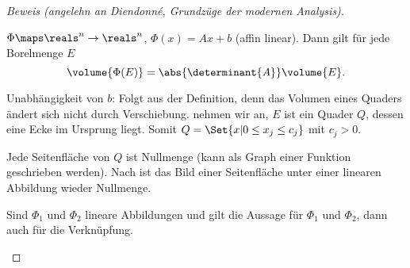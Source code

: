 \begin{proof}[Beweis (angelehn an Diendonné, Grundzüge der modernen Analysis)]
\begin{subproof}
  \end{subproof}
  \begin{lemma}\label{affin_lineare_funzt_mit_borelmenge}
    \( \Phi\maps \reals^n\to \reals^n \), \( \Phi(x)=Ax+b \) (affin linear). Dann gilt für jede Borelmenge \( E \)
    \begin{equation*}
      \volume{\Phi(E)}=\abs{\determinant{A}}\volume{E}.
    \end{equation*}
  \end{lemma}
  \begin{subproof}
    Unabhängigkeit von \( b \): Folgt aus der Definition, denn das Volumen eines Quaders ändert sich nicht durch Verschiebung. \Obda nehmen wir an, \( E \) ist ein Quader \( Q \), dessen eine Ecke im Ursprung liegt. Somit \obda \( Q=\Set{x|0\leq x_j\leq c_j}\) mit \( c_j>0 \).

    Jede Seitenfläche von \( Q \) ist Nullmenge (kann als Graph einer Funktion geschrieben werden). Nach  ist das Bild einer Seitenfläche unter einer linearen Abbildung wieder Nullmenge.

    Sind \( \Phi_1 \) und \( \Phi_2 \) lineare Abbildungen und gilt die Aussage für \( \Phi_1 \) und \( \Phi_2 \), dann auch für die Verknüpfung.


\end{subproof}
\end{proof}
